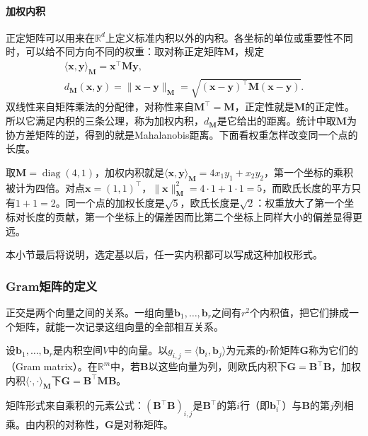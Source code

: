 \paragraph{加权内积}
\label{sec:ls-weighted-inner-products}
正定矩阵可以用来在$\mathbb R^d$上定义标准内积以外的内积。各坐标的单位或重要性不同时，可以给不同方向不同的权重：取对称正定矩阵$\bm M$，规定
\begin{equation}
\begin{gathered}
\langle\bm x,\bm y\rangle_{\bm M}=\bm x^\top\bm M\bm y,\\
d_{\bm M}(\bm x,\bm y)=\lVert\bm x-\bm y\rVert_{\bm M}=\sqrt{(\bm x-\bm y)^\top\bm M(\bm x-\bm y)}.
\end{gathered}
\label{eq:linear-algebra-mahalanobis-pseudodistance}
\end{equation}
双线性来自矩阵乘法的分配律，对称性来自$\bm M^\top=\bm M$，正定性就是$\bm M$的正定性。所以它满足内积的三条公理，称为加权内积，$d_{\bm M}$是它给出的距离。统计中取$\bm M$为协方差矩阵的逆，得到的就是Mahalanobis距离。下面看权重怎样改变同一个点的长度。
\begin{example}[加权内积下的长度]
\label{ex:ls-weighted-length}
取$\bm M=\operatorname{diag}(4,1)$，加权内积就是$\langle\bm x,\bm y\rangle_{\bm M}=4x_1y_1+x_2y_2$，第一个坐标的乘积被计为四倍。对点$\bm x=(1,1)^\top$，$\lVert\bm x\rVert_{\bm M}^2=4\cdot1+1\cdot1=5$，而欧氏长度的平方只有$1+1=2$。同一个点的加权长度是$\sqrt5$，欧氏长度是$\sqrt2$：权重放大了第一个坐标对长度的贡献，第一个坐标上的偏差因而比第二个坐标上同样大小的偏差显得更远。
\end{example}
本小节最后将说明，选定基以后，任一实内积都可以写成这种加权形式。

\subsubsection{Gram矩阵的定义}
\label{sec:ls-gram-orthogonality}
正交是两个向量之间的关系。一组向量$\bm b_1,\ldots,\bm b_r$之间有$r^2$个内积值，把它们排成一个矩阵，就能一次记录这组向量的全部相互关系。
\begin{definition}[有限向量族的Gram矩阵]
\label{def:linear-algebra-gram-matrix}
设$\bm b_1,\ldots,\bm b_r$是内积空间$V$中的向量。以$g_{i,j}=\langle\bm b_i,\bm b_j\rangle$为元素的$r$阶矩阵$\bm G$称为它们的（Gram matrix）。在$\mathbb R^m$中，若$\bm B$以这些向量为列，则欧氏内积下$\bm G=\bm B^\top\bm B$，加权内积$\langle\cdot,\cdot\rangle_{\bm M}$下$\bm G=\bm B^\top\bm M\bm B$。
\end{definition}
矩阵形式来自乘积的元素公式：$(\bm B^\top\bm B)_{i,j}$是$\bm B^\top$的第$i$行（即$\bm b_i^\top$）与$\bm B$的第$j$列相乘。由内积的对称性，$\bm G$是对称矩阵。

